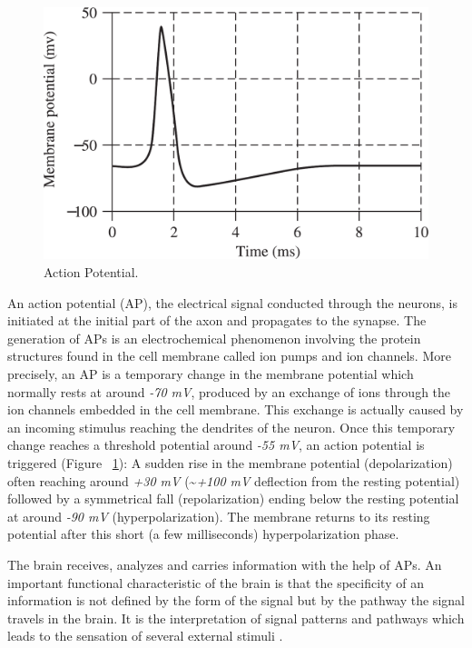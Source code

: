 \documentclass[12pt]{article}
\numberwithin{equation}{section}
\numberwithin{figure}{section}
\numberwithin{table}{section}
\begin{document}
\par{
    \begin{figure}[ht]
        \centering
        \includegraphics[scale=0.4]{images/ap}
        \caption[Action Potential]{Action Potential. \citep{sanei_eeg_2008}}
        \label{fig:action_pot}
    \end{figure}
    An action potential (AP), the electrical signal conducted through the neurons,
    is initiated at the initial part of the axon and propagates to the synapse.
    The generation of APs is an electrochemical phenomenon involving the protein
    structures found in the cell membrane called ion pumps and ion channels.
    More precisely, an AP is a temporary change in the membrane potential which
    normally rests at around \emph{-70 mV}, produced by an exchange of ions through the
    ion channels embedded in the cell membrane. This exchange is actually
    caused by an incoming stimulus reaching the dendrites of the neuron.
    Once this temporary change reaches a threshold potential around \emph{-55 mV}, an action potential is triggered
    (Figure ~\ref{fig:action_pot}): A sudden rise in the membrane potential (depolarization) often
    reaching around \emph{+30 mV} (\textasciitilde\emph{+100 mV} deflection from the resting
    potential) followed by a symmetrical fall (repolarization) ending below the resting potential
    at around \emph{-90 mV} (hyperpolarization). The membrane returns to its resting
    potential after this short (a few milliseconds) hyperpolarization phase.
}
\par{
    The brain receives, analyzes and carries information with the help of APs.
    An important functional characteristic of the brain is that the specificity
    of an information is not defined by the form of the signal but by the pathway
    the signal travels in the brain. It is the interpretation of signal patterns
    and pathways which leads to the sensation of several external stimuli \citep{kandel_principles_2013}.
}
\end{document}
